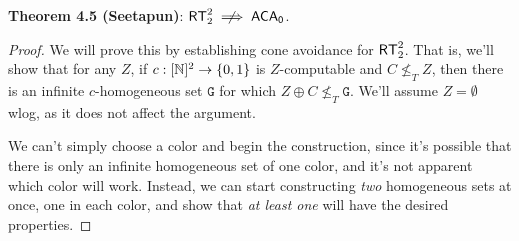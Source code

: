\documentclass{amsart}
\begin{document}
	\noindent \textbf{Theorem 4.5 (Seetapun)}: $\RT^2_2\centernot\implies \ACA$.
	\begin{proof}
		We will prove this by establishing cone avoidance for $\operatorname{\sf{RT}}^2_2$. That is, we'll show that for any $Z$, if $c:[\mathbb{N}]^2\to\{0,1\}$ is $Z$-computable and $C\nleq_T Z$, then there is an infinite $c$-homogeneous set $\mathtt{G}$ for which $Z\oplus C\nleq_T \mathtt{G}$. We'll assume $Z=\emptyset$ wlog, as it does not affect the argument. 
		
		
		
		We can't simply choose a color and begin the construction, since it's possible that there is only an infinite homogeneous set of one color, and it's not apparent which color will work. Instead, we can start constructing \textit{two} homogeneous sets at once, one in each color, and show that \textit{at least one} will have the desired properties. 
		

\end{proof}
\end{document}
